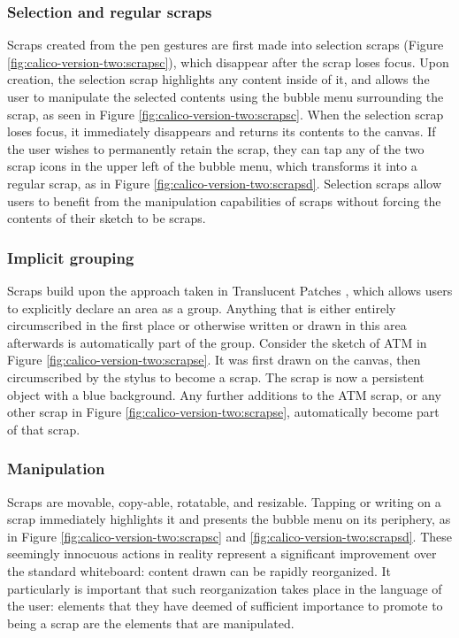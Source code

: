 \documentclass[12pt,fleqn]{ucithesis}
\begin{document}
\subsubsection{Selection and regular scraps} Scraps created from the pen gestures are first made into selection scraps (Figure \ref{fig:calico-version-two:scrapsc}), which disappear after the scrap loses focus. Upon creation, the selection scrap highlights any content inside of it, and allows the user to manipulate the selected contents using the bubble menu surrounding the scrap, as seen in Figure \ref{fig:calico-version-two:scrapsc}. When the selection scrap loses focus, it immediately disappears and returns its contents to the canvas. If the user wishes to permanently retain the scrap, they can tap any of the two scrap icons in the upper left of the bubble menu, which transforms it into a regular scrap, as in Figure \ref{fig:calico-version-two:scrapsd}. Selection scraps allow users to benefit from the manipulation capabilities of scraps without forcing the contents of their sketch to be scraps.

\subsubsection{Implicit grouping} Scraps build upon the approach taken in Translucent Patches \cite{Kramer}, which allows users to explicitly declare an area as a group. Anything that is either entirely circumscribed in the first place or otherwise written or drawn in this area afterwards is automatically part of the group. Consider the sketch of ATM in Figure \ref{fig:calico-version-two:scrapse}. It was first drawn on the canvas, then circumscribed by the stylus to become a scrap. The scrap is now a persistent object with a blue background. Any further additions to the ATM scrap, or any other scrap in Figure \ref{fig:calico-version-two:scrapse}, automatically become part of that scrap.

\subsubsection{Manipulation} Scraps are movable, copy-able, rotatable, and resizable. Tapping or writing on a scrap immediately highlights it and presents the bubble menu on its periphery, as in Figure \ref{fig:calico-version-two:scrapsc} and \ref{fig:calico-version-two:scrapsd}. These seemingly innocuous actions in reality represent a significant improvement over the standard whiteboard: content drawn can be rapidly reorganized. It particularly is important that such reorganization takes place in the language of the user: elements that they have deemed of sufficient importance to promote to being a scrap are the elements that are manipulated.
\end{document}
